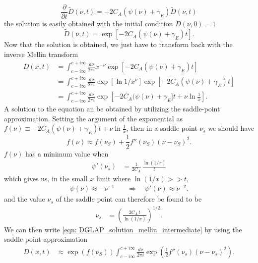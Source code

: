 \documentclass[main.tex]{subfiles}
\begin{document}
\begin{equation}
    \frac{\partial}{\partial t} \tilde D(\nu,t) = -2C_A (\psi(\nu)+\gamma_E) \tilde D(\nu,t)
\end{equation}
the solution is easily obtained with the initial condition \(\tilde D(\nu,0) = 1\)
\begin{equation}\label{eqn: DGLAP_solution_mellinspace}
    \tilde D(\nu,t) = \exp \left[-2C_A (\psi(\nu)+\gamma_E)t\right].
\end{equation}
Now that the solution is obtained, we just have to transform back with the inverse Mellin transform
\begin{align}\label{eqn: DGLAP_solution_mellin_intermediate}
    D(x,t) &= \int_{c-i\infty}^{c+i\infty}\frac{d\nu}{2\pi i} x^{-\nu} \exp \left[-2C_A (\psi(\nu)+\gamma_E)t\right] \nonumber \\
    &= \int_{c-i\infty}^{c+i\infty}\frac{d\nu}{2\pi i} \exp\left[ \ln 1/x^\nu\right] \exp \left[-2C_A (\psi(\nu)+\gamma_E)t\right] \nonumber \\
    &= \int_{c-i\infty}^{c+i\infty}\frac{d\nu}{2\pi i} \exp \left[-2C_A (\psi(\nu)+\gamma_E]t + \nu \ln \frac{1}{x} \right]. 
\end{align}
A solution to the equation an be obtained by utilizing the saddle-point approximation. Setting the argument of the exponential as \(f(\nu) \equiv -2C_A (\psi(\nu)+\gamma_E)t + \nu \ln \frac{1}{x} \), then in a saddle point \(\nu_s\) we should have
\begin{equation}
    f(\nu) \approx f(\nu_S) + \frac{1}{2} f''(\nu_S)(\nu-\nu_S)^2.
\end{equation}
\(f(\nu)\) has a minimum value when 
\begin{align}\label{eqn: DGLAP_mellin_solution_minimum}
    \psi'(\nu_s) &= \frac{1}{2C_A}\,\frac{\ln (1/x)}{t}
\end{align}
which gives us, in the small \(x\) limit where \(\ln (1/x) >> t\), 
\begin{align}
    \psi(\nu) \approx -\nu^{-1} \quad &\Rightarrow \quad \psi'(\nu) \approx \nu^{-2}.
\end{align}
and the value \(\nu_s\) of the saddle point can therefore be found to be
\begin{align}
    \nu_s &= \left(\frac{2C_A\,t}{\ln(1/x)}\right)^{1/2}.
\end{align}
We can then write \autoref{eqn: DGLAP_solution_mellin_intermediate} by using the saddle point-approximation
\begin{align}
    D(x,t) &\approx \exp \left(f(\nu_S) \right) \int_{c-i\infty}^{c+i\infty}\frac{d\nu}{2\pi i} \exp \left(\frac{1}{2} f''(\nu_s)(\nu-\nu_s)^2 \right).
\end{align}
\end{document}
